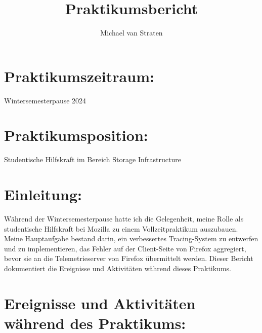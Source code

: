 \documentclass{article}
\title{Praktikumsbericht}
\author{Michael van Straten}
\date{}
\begin{document}
\maketitle

\section*{Praktikumszeitraum:}
Wintersemesterpause 2024

\section*{Praktikumsposition:}
Studentische Hilfskraft im Bereich Storage Infrastructure

\section*{Einleitung:}
Während der Wintersemesterpause hatte ich die Gelegenheit, meine Rolle als studentische Hilfskraft bei Mozilla zu einem Vollzeitpraktikum auszubauen. Meine Hauptaufgabe bestand darin, ein verbessertes Tracing-System zu entwerfen und zu implementieren, das Fehler auf der Client-Seite von Firefox aggregiert, bevor sie an die Telemetrieserver von Firefox übermittelt werden. Dieser Bericht dokumentiert die Ereignisse und Aktivitäten während dieses Praktikums.

\section*{Ereignisse und Aktivitäten während des Praktikums:}
\end{document}
